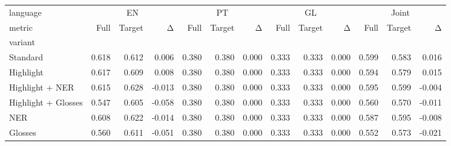 \begin{tabular}{lrrrrrrrrrrrr}
\toprule
language & \multicolumn{3}{c}{EN} & \multicolumn{3}{c}{PT} & \multicolumn{3}{c}{GL} & \multicolumn{3}{c}{Joint} \\
metric & Full & Target & Δ & Full & Target & Δ & Full & Target & Δ & Full & Target & Δ \\
variant &  &  &  &  &  &  &  &  &  &  &  &  \\
\midrule
Standard & 0.618 & 0.612 & 0.006 & 0.380 & 0.380 & 0.000 & 0.333 & 0.333 & 0.000 & 0.599 & 0.583 & 0.016 \\
Highlight & 0.617 & 0.609 & 0.008 & 0.380 & 0.380 & 0.000 & 0.333 & 0.333 & 0.000 & 0.594 & 0.579 & 0.015 \\
Highlight + NER & 0.615 & 0.628 & -0.013 & 0.380 & 0.380 & 0.000 & 0.333 & 0.333 & 0.000 & 0.595 & 0.599 & -0.004 \\
Highlight + Glosses & 0.547 & 0.605 & -0.058 & 0.380 & 0.380 & 0.000 & 0.333 & 0.333 & 0.000 & 0.560 & 0.570 & -0.011 \\
NER & 0.608 & 0.622 & -0.014 & 0.380 & 0.380 & 0.000 & 0.333 & 0.333 & 0.000 & 0.587 & 0.595 & -0.008 \\
Glosses & 0.560 & 0.611 & -0.051 & 0.380 & 0.380 & 0.000 & 0.333 & 0.333 & 0.000 & 0.552 & 0.573 & -0.021 \\
\bottomrule
\end{tabular}
